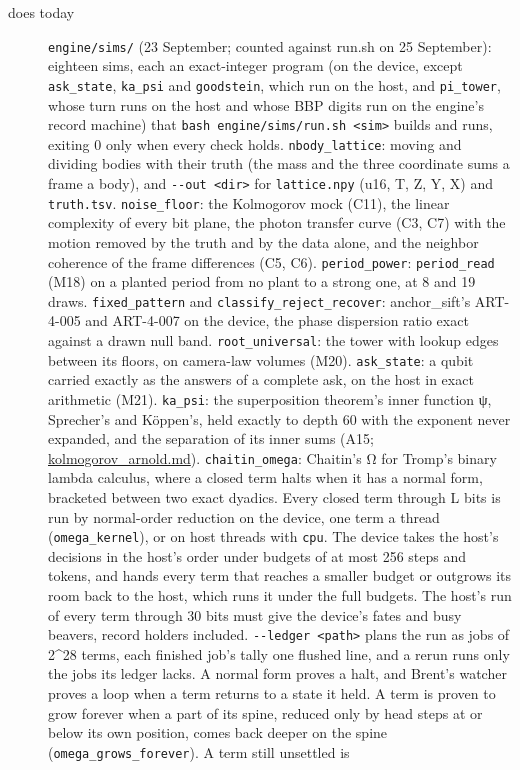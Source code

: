 \begin{description}
\item[{does today}] \texttt{engine/\allowbreak{}sims/\allowbreak{}} (23 September; counted against run.sh on 25 September): eighteen sims, each an exact-integer program (on the device, except \texttt{ask\_\allowbreak{}state}, \texttt{ka\_\allowbreak{}psi} and \texttt{goodstein}, which run on the host, and \texttt{pi\_\allowbreak{}tower}, whose turn runs on the host and whose BBP digits run on the engine's record machine) that \texttt{bash engine/\allowbreak{}sims/\allowbreak{}run.\allowbreak{}sh <sim>} builds and runs, exiting 0 only when every check holds. \texttt{nbody\_\allowbreak{}lattice}: moving and dividing bodies with their truth (the mass and the three coordinate sums a frame a body), and \texttt{-\allowbreak{}-\allowbreak{}out <dir>} for \texttt{lattice.\allowbreak{}npy} (u16, T, Z, Y, X) and \texttt{truth.\allowbreak{}tsv}. \texttt{noise\_\allowbreak{}floor}: the Kolmogorov mock (C11), the linear complexity of every bit plane, the photon transfer curve (C3, C7) with the motion removed by the truth and by the data alone, and the neighbor coherence of the frame differences (C5, C6). \texttt{period\_\allowbreak{}power}: \texttt{period\_\allowbreak{}read} (M18) on a planted period from no plant to a strong one, at 8 and 19 draws. \texttt{fixed\_\allowbreak{}pattern} and \texttt{classify\_\allowbreak{}reject\_\allowbreak{}recover}: anchor\_\allowbreak{}sift's ART-4-005 and ART-4-007 on the device, the phase dispersion ratio exact against a drawn null band. \texttt{root\_\allowbreak{}universal}: the tower with lookup edges between its floors, on camera-law volumes (M20). \texttt{ask\_\allowbreak{}state}: a qubit carried exactly as the answers of a complete ask, on the host in exact arithmetic (M21). \texttt{ka\_\allowbreak{}psi}: the superposition theorem's inner function ψ, Sprecher's and Köppen's, held exactly to depth 60 with the exponent never expanded, and the separation of its inner sums (A15; \hyperref[chap:kolmogorov-arnold]{kolmogorov\_\allowbreak{}arnold.md}). \texttt{chaitin\_\allowbreak{}omega}: Chaitin's Ω for Tromp's binary lambda calculus, where a closed term halts when it has a normal form, bracketed between two exact dyadics. Every closed term through L bits is run by normal-order reduction on the device, one term a thread (\texttt{omega\_\allowbreak{}kernel}), or on host threads with \texttt{cpu}. The device takes the host's decisions in the host's order under budgets of at most 256 steps and tokens, and hands every term that reaches a smaller budget or outgrows its room back to the host, which runs it under the full budgets. The host's run of every term through 30 bits must give the device's fates and busy beavers, record holders included. \texttt{-\allowbreak{}-\allowbreak{}ledger <path>} plans the run as jobs of 2\textasciicircum{}28 terms, each finished job's tally one flushed line, and a rerun runs only the jobs its ledger lacks. A normal form proves a halt, and Brent's watcher proves a loop when a term returns to a state it held. A term is proven to grow forever when a part of its spine, reduced only by head steps at or below its own position, comes back deeper on the spine (\texttt{omega\_\allowbreak{}grows\_\allowbreak{}forever}). A term still unsettled is 
\end{description}
